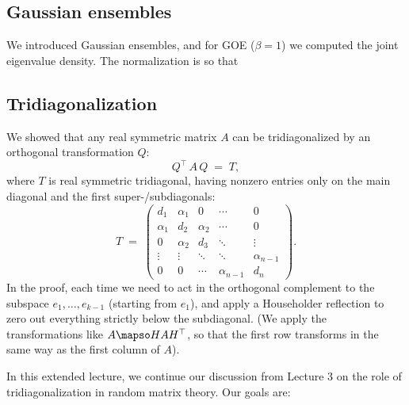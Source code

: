 \documentclass[letterpaper,11pt,oneside,reqno]{article}
\numberwithin{equation}{section}
\theoremstyle{definition}
\begin{document}
\subsection{Gaussian ensembles}

We introduced Gaussian ensembles,
and for GOE ($\beta=1$) we computed the joint eigenvalue density.
The normalization is so that 

\subsection{Tridiagonalization}

We showed that any real symmetric matrix \(A\) can be tridiagonalized by an orthogonal transformation \(Q\):
\[
	Q^\top\,A\,Q \;=\; T,
\]
where \(T\) is real symmetric tridiagonal, having nonzero entries only on the main diagonal and the first super-/subdiagonals:
\begin{equation*}
	T \;=\;
	\begin{pmatrix}
		 d_1 & \alpha_1 & 0 & \cdots & 0\\
		 \alpha_1 & d_2 & \alpha_2 & \cdots & 0\\
		 0 & \alpha_2 & d_3 & \ddots & \vdots\\
		 \vdots & \vdots & \ddots & \ddots & \alpha_{n-1}\\
		 0 & 0 & \cdots & \alpha_{n-1} & d_n
	\end{pmatrix}.
\end{equation*}
In the proof, each time we need to act in the orthogonal complement to the 
subspace $e_1,\ldots,e_{k-1}$ (starting from $e_1$),
and apply a Householder reflection to zero out everything strictly 
below the subdiagonal. (We apply the transformations like
$A\mapso H A H^{\top}$, so that the first row transforms 
in the same way as the first column of $A$).




























In this extended lecture, we continue our discussion from Lecture 3 on the role of tridiagonalization in random matrix theory. Our goals are:
\end{document}
